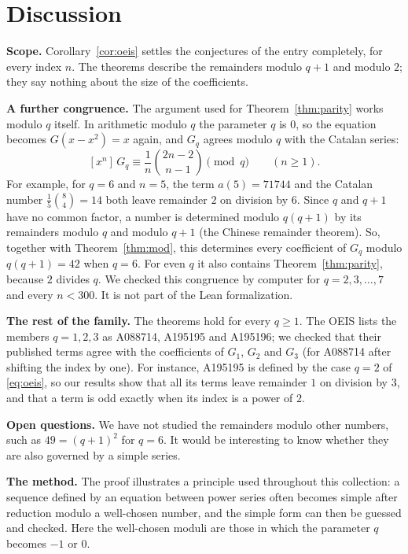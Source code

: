 \documentclass[11pt,a4paper]{article}
\theoremstyle{definition}
\theoremstyle{remark}
\newcommand{\coeff}[2]{[x^{#1}]\,#2}
\newcommand{\para}[1]{\par\medskip\noindent\textbf{#1}\enspace}
\begin{document}
\section{Discussion}\label{sec:discussion}

\para{Scope.} Corollary~\ref{cor:oeis} settles the conjectures of the entry completely,
for every index $n$. The theorems describe the remainders modulo $q+1$ and modulo $2$; they say nothing about the size
of the coefficients.

\para{A further congruence.} The argument used for Theorem~\ref{thm:parity} works modulo $q$ itself. In arithmetic
modulo $q$ the parameter $q$ is $0$, so the equation becomes $G(x-x^2)=x$ again, and $G_q$ agrees modulo $q$ with the
Catalan series:
\[
\coeff{n}{G_q}\equiv\frac{1}{n}\binom{2n-2}{n-1}\pmod q\qquad(n\ge1).
\]
For example, for $q=6$ and $n=5$, the term $a(5)=71744$ and the Catalan number $\frac15\binom84=14$ both leave remainder $2$ on division by $6$. Since $q$ and $q+1$ have no common factor, a number is determined modulo $q(q+1)$ by its
remainders modulo $q$ and modulo $q+1$ (the Chinese remainder theorem). So, together with Theorem~\ref{thm:mod}, this
determines every coefficient of $G_q$ modulo $q(q+1)=42$ when $q=6$. For even $q$ it also contains Theorem~\ref{thm:parity}, because $2$ divides $q$. We checked
this congruence by computer for $q=2,3,\dots,7$ and every $n<300$. It is not part of the Lean formalization.

\para{The rest of the family.} The theorems hold for every $q\ge1$. The OEIS lists the members $q=1,2,3$ as A088714,
A195195 and A195196; we checked that their published terms agree with the coefficients of $G_1$, $G_2$ and $G_3$ (for
A088714 after shifting the index by one). For instance, A195195 is defined by the case $q=2$ of
\eqref{eq:oeis}, so our results show that all its terms leave remainder $1$ on division by $3$, and that a term is odd
exactly when its index is a power of $2$.

\para{Open questions.} We have not studied the remainders modulo other numbers, such as $49=(q+1)^2$
for $q=6$. It would be interesting to know whether they are also governed by a simple series.

\para{The method.} The proof illustrates a principle used throughout this collection: a sequence defined by an
equation between power series often becomes simple after reduction modulo a well-chosen number, and the simple form can
then be guessed and checked. Here the well-chosen moduli are those in which the parameter $q$ becomes $-1$ or $0$.
\end{document}
